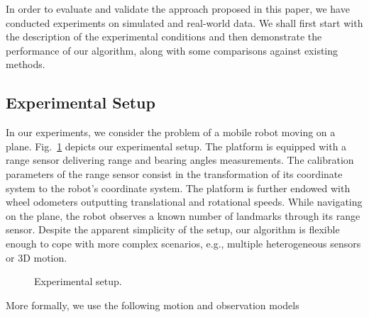 In order to evaluate and validate the approach proposed in this paper, we have
conducted experiments on simulated and real-world data. We shall first start
with the description of the experimental conditions and then demonstrate the
performance of our algorithm, along with some comparisons against existing
methods.

\subsection{Experimental Setup}

In our experiments, we consider the problem of a mobile robot moving on a plane.
Fig.~\ref{fig:exp_setup} depicts our experimental setup. The platform is
equipped with a range sensor delivering range and bearing angles measurements.
The calibration parameters of the range sensor consist in the transformation of
its coordinate system to the robot's coordinate system. The platform is further
endowed with wheel odometers outputting translational and rotational speeds.
While navigating on the plane, the robot observes a known number of landmarks
through its range sensor. Despite the apparent simplicity of the setup, our
algorithm is flexible enough to cope with more complex scenarios, e.g., multiple
heterogeneous sensors or 3D motion.

\begin{figure}[t]
\centering
{}
\caption{Experimental setup.}
\label{fig:exp_setup}
\end{figure}

More formally, we use the following motion and observation models

